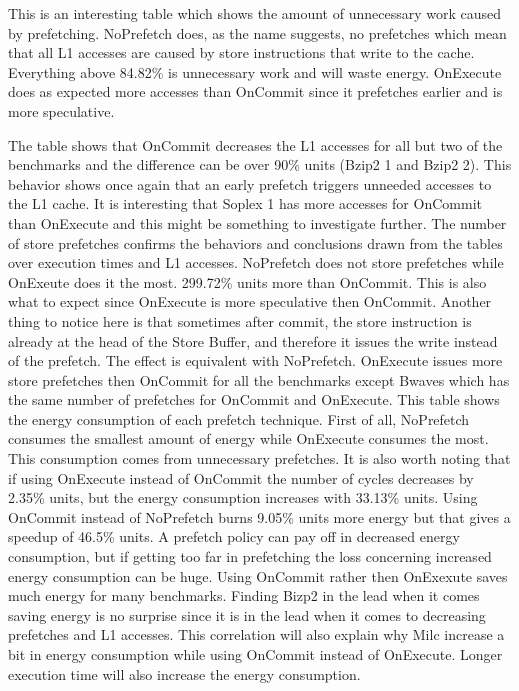 This is an interesting table which shows the amount of unnecessary work caused
by prefetching. NoPrefetch does, as the name suggests, no prefetches which mean that
all L1 accesses are caused by store instructions that write to the cache. Everything
above 84.82\% is unnecessary work and will waste energy. OnExecute does as expected
more accesses than OnCommit since it prefetches earlier and is more speculative.

The table shows that OnCommit decreases the L1 accesses for all but two of
the benchmarks and the difference can be over 90\% units (Bzip2 1 and Bzip2 2).
This behavior shows once again that an early prefetch triggers unneeded accesses to
 the L1 cache. It is interesting that Soplex 1 has more accesses for OnCommit than
OnExecute and this might be something to investigate further.
\resSp
{}
The number of store prefetches confirms the behaviors and conclusions drawn from the tables over execution times and L1 accesses. NoPrefetch does not store prefetches
while OnExeute does it the most. 299.72\% units more than OnCommit. This is also
what to expect since OnExecute is more speculative then OnCommit. Another thing
to notice here is that sometimes after commit, the store instruction is already at the
head of the Store Buffer, and therefore it issues the write instead of the prefetch. The
effect is equivalent with NoPrefetch.
OnExecute issues more store prefetches then OnCommit for all the benchmarks
except Bwaves which has the same number of prefetches for OnCommit and OnExecute.
\resEnergy
{}
This table shows the energy consumption of each prefetch technique. First of all,
NoPrefetch consumes the smallest amount of energy while OnExecute consumes the
most. This consumption comes from unnecessary prefetches. It is also worth noting
that if using OnExecute instead of OnCommit the number of cycles decreases by 2.35\%
units, but the energy consumption increases with 33.13\% units. Using OnCommit
instead of NoPrefetch burns 9.05\% units more energy but that gives a speedup of
46.5\% units. A prefetch policy can pay off in decreased energy consumption, but if getting too far in prefetching the loss concerning increased energy consumption can be huge.
Using OnCommit rather then OnExexute saves much energy for many benchmarks. Finding Bizp2 in the lead when it comes saving energy is no surprise since it is in the lead when it comes to decreasing prefetches and L1 accesses. This correlation will also explain why Milc increase a bit in energy consumption while using OnCommit instead of OnExecute. Longer execution time will also increase the energy consumption.



